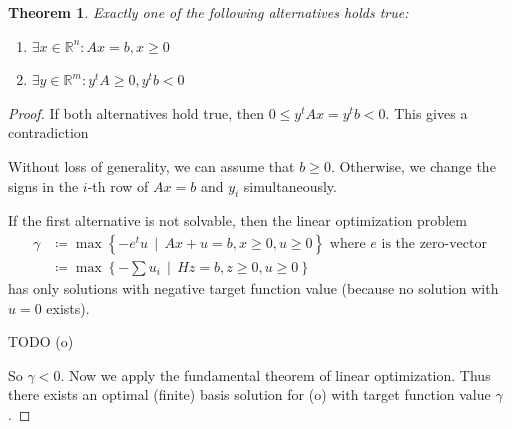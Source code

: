\documentclass{article}
\newcounter{lecref}[section]
\numberwithin{lecref}{section}
\newtheorem{theorem}[lecref]{Theorem}
\newcommand{\SetDef}[2]{\left\{#1\,\mid\,#2\right\}}
\begin{document}
\begin{theorem}
	\label{theorem:4.3}
	Exactly one of the following alternatives holds true:
	\begin{enumerate}
		\item $\exists x \in \mathbb R^n: Ax = b, x \geq 0$
		\item $\exists y \in \mathbb R^m: y^t A \geq 0, y^t b < 0$
	\end{enumerate}
\end{theorem}

\begin{proof}
	If both alternatives hold true, then $0 \leq y^tAx = y^tb < 0$. This gives a contradiction

	Without loss of generality, we can assume that $b \geq 0$. Otherwise, we change the signs in the $i$-th row of $Ax = b$ and $y_i$ simultaneously.

	If the first alternative is not solvable, then the linear optimization problem 
	\begin{align*}
		\gamma &\coloneqq \max\SetDef{-e^tu}{Ax + u = b, x \geq 0, u \geq 0} \text{ where $e$ is the zero-vector} \\
			   &\coloneqq \max\SetDef{-\sum u_i}{Hz = b, z \geq 0, u \geq 0}
	\end{align*}
	has only solutions with negative target function value (because no solution with $u = 0$ exists).

	TODO (o)

	So $\gamma < 0$. Now we apply the fundamental theorem of linear optimization.
	Thus there exists an optimal (finite) basis solution for (o) with target function value $\gamma$.
\end{proof}


\printindex
\end{document}
